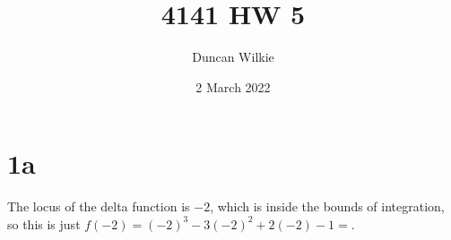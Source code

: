 \documentclass{article}
\title{4141 HW 5}
\author{Duncan Wilkie}
\date{2 March 2022}
\begin{document}
\maketitle

\section*{1a}
The locus of the delta function is $-2$, which is inside the bounds of integration, so this is just $f(-2)=(-2)^{3}-3(-2)^{2}+2(-2)-1=$.
\end{document}
